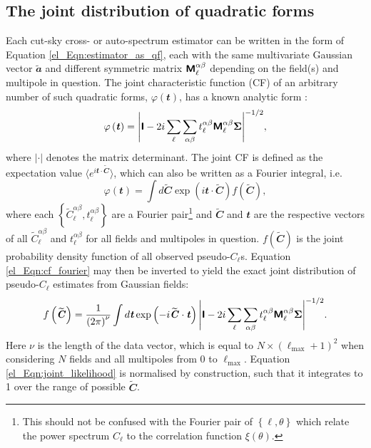 \subsection{The joint distribution of quadratic forms}

Each cut-sky cross- or auto-spectrum estimator can be written in the form of Equation \eqref{el_Eqn:estimator_as_qf}, each with the same multivariate Gaussian vector $\widetilde{\mathbfit{a}}$ and different symmetric matrix $\bm{\mathsf{M}}_\ell^{\alpha \beta}$ depending on the field(s) and multipole in question. The joint characteristic function (CF) of an arbitrary number of such quadratic forms, $\varphi \left( \mathbfit{t} \right)$, has a known analytic form \citep{Good1963}:
\begin{equation}
    \varphi \left( \bm{\mathit{t}} \right) =
    \Bigg\lvert \bm{\mathsf{I}} - 2i \sum_\ell \sum_{\alpha \beta}
    t_\ell^{\alpha \beta} \bm{\mathsf{M}}_\ell^{\alpha \beta} \bm{\Sigma}
    \Bigg\rvert^{-1/2},
    \label{el_Eqn:joint_cf}
\end{equation}
where $\lvert \cdot \rvert$ denotes the matrix determinant. The joint CF is defined as the expectation value $\langle e^{i \mathbfit{t} \cdot \widetilde{\mathbfit{C}}} \rangle$, which can also be written as a Fourier integral, i.e.
\begin{equation}
    \varphi \left( \mathbfit{t} \right) =
    \int d\widetilde{\mathbfit{C}}
    \exp \left( i \mathbfit{t} \cdot \widetilde{\mathbfit{C}} \right)
    f \left( \widetilde{\mathbfit{C}} \right),
    \label{el_Eqn:cf_fourier}
\end{equation}
where each $\left\{ \widetilde{C}_\ell^{\alpha \beta}, t_\ell^{\alpha \beta} \right\}$ are a Fourier pair\footnote{This should not be confused with the Fourier pair of $\left\{ \ell, \theta \right\}$ which relate the power spectrum $C_\ell$ to the correlation function $\xi \left( \theta \right)$.} and $\widetilde{\mathbfit{C}}$ and $\mathbfit{t}$ are the respective vectors of all $\widetilde{C}_\ell^{\alpha \beta}$ and $t_\ell^{\alpha \beta}$ for all fields and multipoles in question. $f \left( \widetilde{\mathbfit{C}} \right)$ is the joint probability density function of all observed pseudo-$C_\ell$s. Equation \eqref{el_Eqn:cf_fourier} may then be inverted to yield the exact joint distribution of pseudo-$C_\ell$ estimates from Gaussian fields:
\begin{equation}
    f \left( \widetilde{\bm{\mathit{C}}} \right) =
    \frac{1}{\left( 2 \pi \right)^\nu}
    \int d\bm{\mathit{t}}
    \exp \left( -i \widetilde{\bm{\mathit{C}}} \cdot  \bm{\mathit{t}} \right)
    \Bigg\lvert \bm{\mathsf{I}} - 2i \sum_\ell \sum_{\alpha \beta}
    t_{\ell}^{\alpha \beta} \bm{\mathsf{M}}_\ell^{\alpha \beta} \bm{\Sigma}
    \Bigg\rvert^{-1/2}.
    \label{el_Eqn:joint_likelihood}
\end{equation}
Here $\nu$ is the length of the data vector, which is equal to $N \times \left( \ell_\mathrm{max} + 1 \right)^2$ when considering $N$ fields and all multipoles from $0$ to $\ell_\mathrm{max}$. Equation \eqref{el_Eqn:joint_likelihood} is normalised by construction, such that it integrates to 1 over the range of possible $\widetilde{\mathbfit{C}}$.

